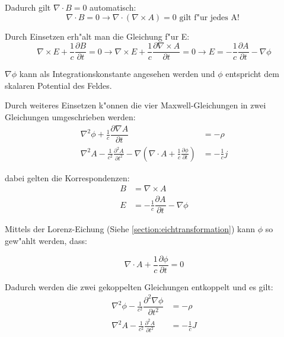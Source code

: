 Dadurch gilt $\nabla \cdot B = 0 $ automatisch:
\begin{equation}
\nabla \cdot B = 0 \rightarrow \nabla \cdot ( \nabla\times A ) = 0 \text{ gilt f"ur jedes A! }
\end{equation}

Durch Einsetzen erh"alt man die Gleichung f"ur E:
\begin{equation}
\nabla\times E + \frac{1}{c} \frac{\partial B }{\partial t} = 0
\rightarrow \nabla\times E + \frac{1}{c} \frac{\partial \nabla\times A }{\partial t} = 0 \rightarrow E = -\frac{1}{c} \dfrac{\partial A}{\partial t} - \nabla \phi
\end{equation}

$\nabla \phi$ kann als Integrationskonstante angesehen werden und $\phi$ entspricht dem skalaren Potential des Feldes.

Durch weiteres Einsetzen k"onnen die vier Maxwell-Gleichungen in zwei Gleichungen umgeschrieben werden:
\begin{equation}
\begin{split}
 \nabla^2 \phi + \frac{1}{c} \dfrac{\partial \nabla A}{\partial t} &= -\rho \\
 \nabla^2 A - \frac{1}{c^2} \frac{\partial^2 A }{\partial t^2} - \nabla \left( \nabla \cdot A + \frac{1}{c} \frac{\partial \phi }{\partial t} \right) &= - \frac{1}{c} j
\end{split}
\end{equation}

dabei gelten die Korrespondenzen:
\begin{equation}
\begin{split}
B &= \nabla\times A \\
E &= -\frac{1}{c} \dfrac{\partial A}{\partial t} - \nabla \phi
\end{split}
\end{equation}

Mittels der Lorenz-Eichung (Siehe \ref{section:eichtransformation}) kann $\phi$ so gew"ahlt werden, dass:

\begin{equation}
\nabla \cdot A + \frac{1}{c} \frac{\partial \phi }{\partial t} = 0
\end{equation}

Dadurch werden die zwei gekoppelten Gleichungen entkoppelt und es gilt:
\begin{equation}
\begin{split}
\nabla^2 \phi - \frac{1}{c^2} \dfrac{\partial^2 \nabla \phi}{\partial t^2} &= -\rho \\
\nabla^2 A - \frac{1}{c^2} \frac{\partial^2 A }{\partial t^2} &= - \frac{1}{c} J
\end{split}
\end{equation}

